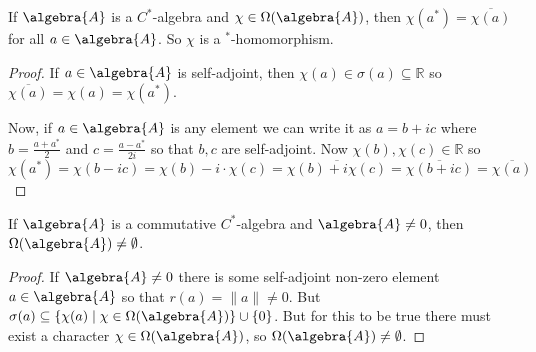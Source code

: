 \documentclass[a4paper]{article}
\begin{document}
\begin{corollary}
	If $\algebra{A}$ is a $C^*$-algebra and $\chi \in \Omega(\algebra{A})$, then $\chi(a^*) = \overline{\chi(a)}$ for all $a \in \algebra{A}$.
	So $\chi$ is a $^*$-homomorphism.
\end{corollary}

\begin{proof}
	If $a \in \algebra{A}$ is self-adjoint, then $\chi(a) \in \sigma(a) \subseteq \mathds{R}$ so $\overline{\chi(a)} = \chi(a) = \chi(a^*)$.

	Now, if $a \in \algebra{A}$ is any element we can write it as $a = b + i c$ where $b = \frac{a + a^*}{2}$ and $c = \frac{a - a^*}{2i}$ so that $b,c$ are self-adjoint. Now $\chi(b),\chi(c) \in \mathds{R}$ so
	\begin{equation*}
		\chi(a^*) = \chi(b - ic) = \chi(b) - i \cdot \chi(c) = \overline{\chi(b) + i \chi(c)} = \overline{\chi(b + ic)} = \overline{\chi(a)}
	\end{equation*}
\end{proof}

\begin{corollary}
	If $\algebra{A}$ is a commutative $C^*$-algebra and $\algebra{A} \neq 0$, then $\Omega(\algebra{A}) \neq \emptyset$.
\end{corollary}

\begin{proof}
	If $\algebra{A} \neq 0$ there is some self-adjoint non-zero element $a \in \algebra{A}$ so that $r(a) = \|a\| \neq 0$. But $\sigma(a) \subseteq \{ \chi(a) \mid \chi \in \Omega(\algebra{A}) \} \cup \{0\}$.
	But for this to be true there must exist a character $\chi \in \Omega(\algebra{A})$, so $\Omega(\algebra{A}) \neq \emptyset$.
\end{proof}
\end{document}
